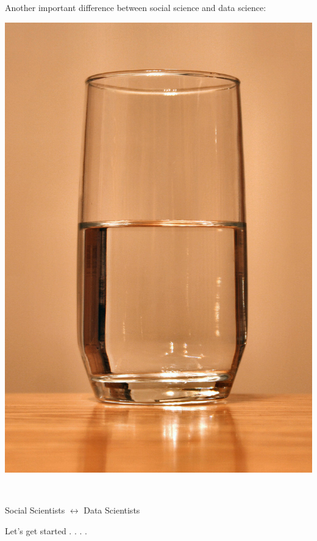\documentclass{beamer}
\def\vf{\vfill}
\begin{document}
\begin{frame}

Another important difference between social science and data science:
\begin{center}
\includegraphics[height=0.7\textheight]{figures/glass-of-water.jpg}
\end{center}

\vf
\vspace{0.5in}
\\
\end{frame}
\begin{frame}

\begin{center}
\LARGE{Social Scientists $\longleftrightarrow$ Data Scientists}
\end{center}

\end{frame}
\begin{frame}

\begin{center}
\LARGE{Let's get started . . . . }
\end{center}


\end{frame}
\end{document}
